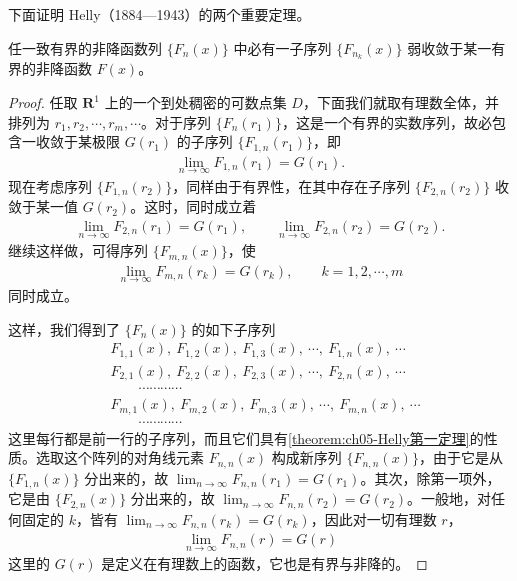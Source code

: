 \documentclass[../../main.tex]{subfiles}
\begin{document}
下面证明 Helly（1884—1943）的两个重要定理。

\begin{theorem}\label{theorem:ch05-Helly第一定理}
任一致有界的非降函数列 $\{F_n(x)\}$ 中必有一子序列 $\{F_{n_k}(x)\}$ 弱收敛于某一有界的非降函数 $F(x)$。
\end{theorem}

\begin{proof}
任取 $\mathbf{R}^{1}$ 上的一个到处稠密的可数点集 $D$，下面我们就取有理数全体，并排列为 $r_1,r_2,\cdots,r_m,\cdots$。对于序列 $\{F_n(r_1)\}$，这是一个有界的实数序列，故必包含一收敛于某极限 $G(r_1)$ 的子序列 $\{F_{1,n}(r_1)\}$，即
\begin{align*}
\lim_{n\to\infty}F_{1,n}(r_1)=G(r_1).
\end{align*}
现在考虑序列 $\{F_{1,n}(r_2)\}$，同样由于有界性，在其中存在子序列 $\{F_{2,n}(r_2)\}$ 收敛于某一值 $G(r_2)$。这时，同时成立着
\begin{align*}
\lim_{n\to\infty}F_{2,n}(r_1)=G(r_1),\qquad \lim_{n\to\infty}F_{2,n}(r_2)=G(r_2).
\end{align*}
继续这样做，可得序列 $\{F_{m,n}(x)\}$，使
\begin{align}
\lim_{n\to\infty}F_{m,n}(r_k)=G(r_k),\qquad k=1,2,\cdots,m
\end{align}
同时成立。

这样，我们得到了 $\{F_n(x)\}$ 的如下子序列
\begin{align*}
&F_{1,1}(x),\ F_{1,2}(x),\ F_{1,3}(x),\ \cdots,\ F_{1,n}(x),\ \cdots\\
&F_{2,1}(x),\ F_{2,2}(x),\ F_{2,3}(x),\ \cdots,\ F_{2,n}(x),\ \cdots\\
&\qquad\cdots\cdots\cdots\cdots\\
&F_{m,1}(x),\ F_{m,2}(x),\ F_{m,3}(x),\ \cdots,\ F_{m,n}(x),\ \cdots\\
&\qquad\cdots\cdots\cdots\cdots
\end{align*}
这里每行都是前一行的子序列，而且它们具有\cref{theorem:ch05-Helly第一定理}的性质。选取这个阵列的对角线元素 $F_{n,n}(x)$ 构成新序列 $\{F_{n,n}(x)\}$，由于它是从 $\{F_{1,n}(x)\}$ 分出来的，故 $\lim_{n\to\infty}F_{n,n}(r_1)=G(r_1)$。其次，除第一项外，它是由 $\{F_{2,n}(x)\}$ 分出来的，故 $\lim_{n\to\infty}F_{n,n}(r_2)=G(r_2)$。一般地，对任何固定的 $k$，皆有 $\lim_{n\to\infty}F_{n,n}(r_k)=G(r_k)$，因此对一切有理数 $r$，
\begin{align}
\lim_{n\to\infty}F_{n,n}(r)=G(r)
\end{align}
这里的 $G(r)$ 是定义在有理数上的函数，它也是有界与非降的。


\end{proof}
\end{document}
